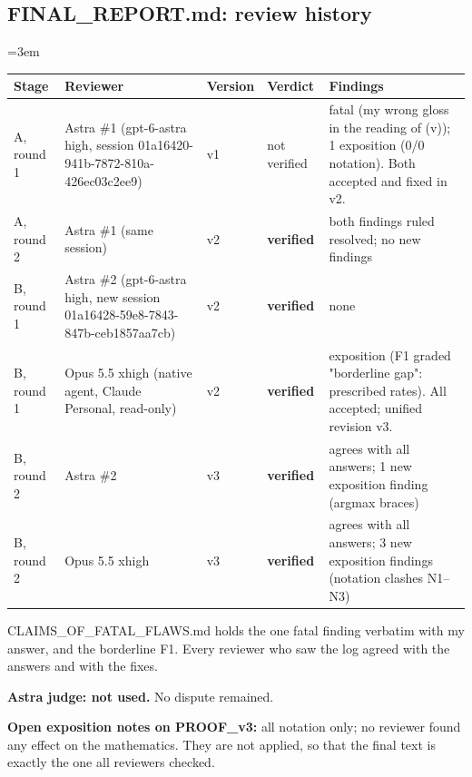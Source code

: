 \documentclass[11pt]{report}
\newenvironment{mdblock}{\begingroup\mdfont\raggedright\setlength{\parindent}{0pt}\setlength{\parskip}{0.55em}\emergencystretch=3em}{\par\endgroup}
\newcommand{\mdhead}[2]{\par\vspace{0.7em}\noindent{\bfseries\ifcase#1\or\large\or\normalsize\or\normalsize\or\small\or\small\or\small\fi #2}\par\nopagebreak\vspace{0.1em}}
\newcommand{\mdsubsec}[1]{\phantomsection\subsection*{#1}}
\begin{document}
\mdsubsec{FINAL\_REPORT.md: review history}
\begin{mdblock}
\mdhead{2}{4. Review history}

{\small
\begin{longtable}{|>{\raggedright\arraybackslash}p{}|>{\raggedright\arraybackslash}p{}|>{\raggedright\arraybackslash}p{}|>{\raggedright\arraybackslash}p{}|>{\raggedright\arraybackslash}p{}|}
\hline
\textbf{Stage} & \textbf{Reviewer} & \textbf{Version} & \textbf{Verdict} & \textbf{Findings} \\ \hline\endhead
A, round 1 & Astra \#1 (gpt-6-astra high, session 01a16420-941b-7872-810a-426ec03c2ee9) & v1 & not verified & 1 fatal (my wrong gloss in the reading of (v)); 1 exposition (0/0 notation). Both accepted and fixed in v2. \\ \hline
A, round 2 & Astra \#1 (same session) & v2 & \textbf{verified} & both findings ruled resolved; no new findings \\ \hline
B, round 1 & Astra \#2 (gpt-6-astra high, new session 01a16428-59e8-7843-847b-ceb1857aa7cb) & v2 & \textbf{verified} & none \\ \hline
B, round 1 & Opus 5.5 xhigh (native agent, Claude Personal, read-only) & v2 & \textbf{verified} & 7 exposition (F1 graded "borderline gap": prescribed rates). All accepted; unified revision v3. \\ \hline
B, round 2 & Astra \#2 & v3 & \textbf{verified} & agrees with all answers; 1 new exposition finding (argmax braces) \\ \hline
B, round 2 & Opus 5.5 xhigh & v3 & \textbf{verified} & agrees with all answers; 3 new exposition findings (notation clashes N1–N3) \\ \hline
\end{longtable}}

\begin{mdbul}
\item CLAIMS\_OF\_FATAL\_FLAWS.md holds the one fatal finding verbatim with my answer, and the borderline F1. Every reviewer who saw the log agreed with the answers and with the fixes.
\item \textbf{Astra judge: not used.} No dispute remained.
\item \textbf{Open exposition notes on PROOF\_v3:} all notation only; no reviewer found any effect on the mathematics. They are not applied, so that the final text is exactly the one all reviewers checked.


\end{mdbul}
\end{mdblock}
\end{document}
